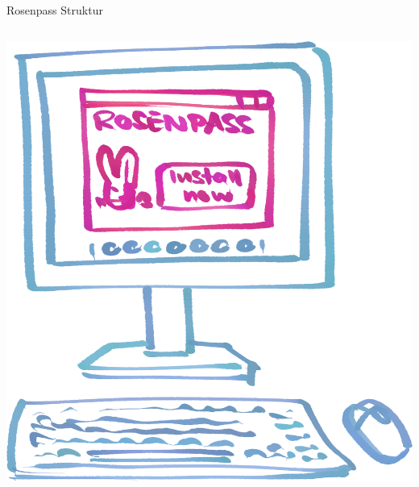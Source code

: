 \documentclass{rosenpass-beamer}
\begin{document}
\begin{frame}{Rosenpass Struktur}
\begin{columns}[c]
\begin{column}{0.2\textwidth}
\medskip
\includegraphics[width=\linewidth]{graphics/Illu-install.png}

\end{column}
\end{columns}
\end{frame}
\end{document}

